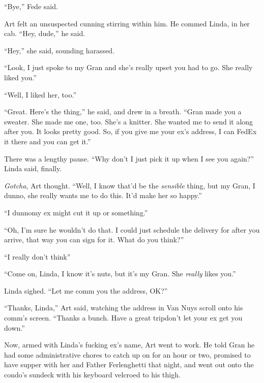 “Bye,” Fede said.

Art felt an unsuspected cunning stirring within him. He commed
Linda, in her cab. “Hey, dude,” he said.

“Hey,” she said, sounding harassed.

“Look, I just spoke to my Gran and she’s really upset you had to
go. She really liked you.”

“Well, I liked her, too.”

“Great. Here’s the thing,” he said, and drew in a breath. “Gran
made you a sweater. She made me one, too. She’s a knitter. She
wanted me to send it along after you. It looks pretty good. So, if
you give me your ex’s address, I can FedEx it there and you can get
it.”

There was a lengthy pause. “Why don’t I just pick it up when I see
you again?” Linda said, finally.

\emph{Gotcha}, Art thought. “Well, I know that’d be the
\emph{sensible} thing, but my Gran, I dunno, she really wants me to
do this. It’d make her so happy.”

“I dunno{\dash}my ex might cut it up or something.”

“Oh, I’m sure he wouldn’t do that. I could just schedule the
delivery for after you arrive, that way you can sign for it. What
do you think?”

“I really don’t think{\dash}”

“Come on, Linda, I know it’s nuts, but it’s my Gran. She
\emph{really} likes you.”

Linda sighed. “Let me comm you the address, OK?”

“Thanks, Linda,” Art said, watching the address in Van Nuys scroll
onto his comm’s screen. “Thanks a bunch. Have a great trip{\dash}don’t
let your ex get you down.”

Now, armed with Linda’s fucking ex’s name, Art went to work. He
told Gran he had some administrative chores to catch up on for an
hour or two, promised to have supper with her and Father
Ferlenghetti that night, and went out onto the condo’s sundeck with
his keyboard velcroed to his thigh.


